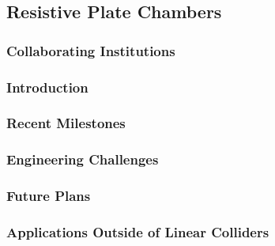 \subsection{Resistive Plate Chambers}
\subsubsection{Collaborating Institutions}
\subsubsection{Introduction}
\subsubsection{Recent Milestones}
\subsubsection{Engineering Challenges}
\subsubsection{Future Plans}
\subsubsection{Applications Outside of Linear Colliders}
